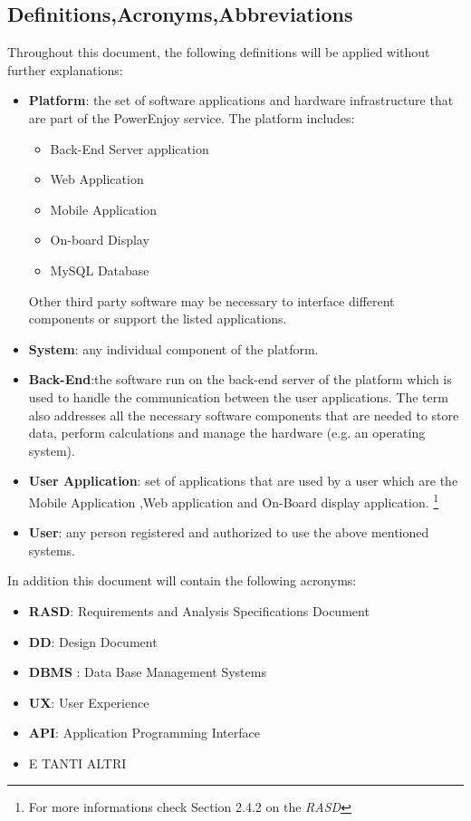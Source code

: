 \subsection{Definitions,Acronyms,Abbreviations}
Throughout this document, the following definitions will be applied without
further explanations:
\begin{itemize}
\item \textbf{Platform}: the set of software applications and hardware infrastructure that are part of the PowerEnjoy service. The platform includes:
	\begin{itemize}
	\item Back-End Server application
	\item Web Application
	\item Mobile Application
	\item On-board Display
	\item MySQL Database
	\end{itemize}
	Other third party software may be necessary to interface different components 	
	or support the listed applications.
\item \textbf{System}: any individual component of the platform.
\item \textbf{Back-End}:the software run on the back-end server of the platform which is used to handle the communication between the user applications. The
term also addresses all the necessary software components that are needed
to store data, perform calculations and manage the hardware (e.g. an operating
system).
\item \textbf{User Application}: set of applications that are used by a user which are the Mobile Application ,Web application and On-Board display application.
\footnote{For more informations check Section 2.4.2 on the \emph{RASD}} 
\item \textbf{User}: any person registered and authorized to use the above mentioned systems.
\end{itemize}
In addition this document will contain the following acronyms:
\begin{itemize}
\item \textbf{RASD}: Requirements and Analysis Specifications Document
\item \textbf{DD}: Design Document
\item \textbf{DBMS} : Data Base Management Systems
\item \textbf{UX}: User Experience
\item \textbf{API}: Application Programming Interface 
\item E TANTI ALTRI
\end{itemize}


